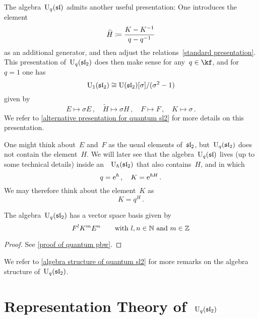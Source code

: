 \documentclass[a4paper, 11pt, oneside]{scrartcl}
\begin{document}
\begin{remark}[The case~$q = 1$]
  \label{quantum U1}
  The algebra~$\operatorname{U}_q(\mathfrak{sl})$ admits another useful presentation:
  One introduces the element
  \[
    \widetilde{H}
    \coloneqq
    \frac{K - K^{-1}}{q - q^{-1}}
  \]
  as an additional generator, and then adjust the relations~\eqref{standard presentation}.
  This presentation of~$\operatorname{U}_q(\mathfrak{sl}_2)$ does then make sense for any~$q \in \kf$, and for~$q = 1$ one has
  \[
    \operatorname{U}_1(\mathfrak{sl}_2)
    \cong
    \operatorname{U}(\mathfrak{sl}_2)[\sigma]/(\sigma^2 - 1)
  \]
  given by
  \begin{equation}
    \label{isomorphism for U1}
    E \mapsto \sigma E \,,
    \quad
    \widetilde{H} \mapsto \sigma H \,,
    \quad
    F \mapsto F \,,
    \quad
    K \mapsto \sigma \,.
  \end{equation}
  We refer to \cref{alternative presentation for quantum sl2} for more details on this presentation.
\end{remark}

\begin{remark}
  One might think about~$E$ and~$F$ as the usual elements of~$\mathfrak{sl}_2$, but~$\operatorname{U}_q(\mathfrak{sl}_2)$ does not contain the element~$H$.
  We will later see that the algebra~$\operatorname{U}_q(\mathfrak{sl})$ lives (up to some technical details) inside an~\algebra{$\kfhbar$}~$\operatorname{U}_{\hbar}(\mathfrak{sl}_2)$ that also contains~$H$, and in which
  \[
    q = \mathrm{e}^{\hbar} \,,
    \quad
    K = \mathrm{e}^{\hbar H} \,.
  \]
  We may therefore think about the element~$K$ as
  \[
    K
    =
    q^H \,.
  \]
\end{remark}

\begin{theorem}
  \label{quantum pbw}
  The algebra~$\operatorname{U}_q(\mathfrak{sl}_2)$ has a vector space basis given by
  \[
    F^l K^m E^n
    \qquad
    \text{with~$l, n \in \mathbb{N}$ and~$m \in \mathbb{Z}$} 
  \]
\end{theorem}

\begin{proof}
  See \cref{proof of quantum pbw}.
\end{proof}

We refer to \cref{algebra structure of quantum sl2} for more remarks on the algebra structure of~$\operatorname{U}_q(\mathfrak{sl}_2)$.





\section{Representation Theory of~$\operatorname{U}_q(\mathfrak{sl}_2)$}
\end{document}

